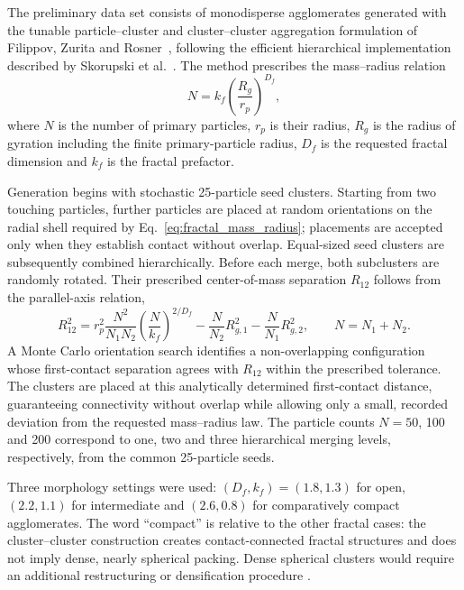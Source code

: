 \documentclass[12pt,a4paper]{article}
\begin{document}
The preliminary data set consists of monodisperse agglomerates generated with
the tunable particle--cluster and cluster--cluster aggregation formulation of
Filippov, Zurita and Rosner~\cite{Filippov2000}, following the efficient
hierarchical implementation described by Skorupski et
al.~\cite{Skorupski2014}. The method prescribes the mass--radius relation
\begin{equation}
    N=k_f\left(\frac{R_g}{r_p}\right)^{D_f},
    \label{eq:fractal_mass_radius}
\end{equation}
where $N$ is the number of primary particles, $r_p$ is their radius, $R_g$ is
the radius of gyration including the finite primary-particle radius, $D_f$ is
the requested fractal dimension and $k_f$ is the fractal prefactor.

Generation begins with stochastic 25-particle seed clusters. Starting from two
touching particles, further particles are placed at random orientations on the
radial shell required by Eq.~\eqref{eq:fractal_mass_radius}; placements are
accepted only when they establish contact without overlap. Equal-sized seed
clusters are subsequently combined hierarchically. Before each merge, both
subclusters are randomly rotated. Their prescribed center-of-mass separation
$R_{12}$ follows from the parallel-axis relation,
\begin{equation}
 R_{12}^{2}=
 r_p^2\frac{N^2}{N_1N_2}
 \left(\frac{N}{k_f}\right)^{2/D_f}
 -\frac{N}{N_2}R_{g,1}^{2}
 -\frac{N}{N_1}R_{g,2}^{2},
 \qquad N=N_1+N_2.
 \label{eq:cca_separation}
\end{equation}
A Monte Carlo orientation search identifies a non-overlapping configuration
whose first-contact separation agrees with $R_{12}$ within the prescribed
tolerance. The clusters are placed at this analytically determined
first-contact distance, guaranteeing connectivity without overlap while
allowing only a small, recorded deviation from the requested mass--radius law.
The particle counts $N=50$, 100 and 200 correspond to one, two and three
hierarchical merging levels, respectively, from the common 25-particle seeds.

Three morphology settings were used: $(D_f,k_f)=(1.8,1.3)$ for open,
$(2.2,1.1)$ for intermediate and $(2.6,0.8)$ for comparatively compact
agglomerates. The word ``compact'' is relative to the other fractal cases: the
cluster--cluster construction creates contact-connected fractal structures and
does not imply dense, nearly spherical packing. Dense spherical clusters would
require an additional restructuring or densification procedure
\cite{Ehrl2009}.
\end{document}

